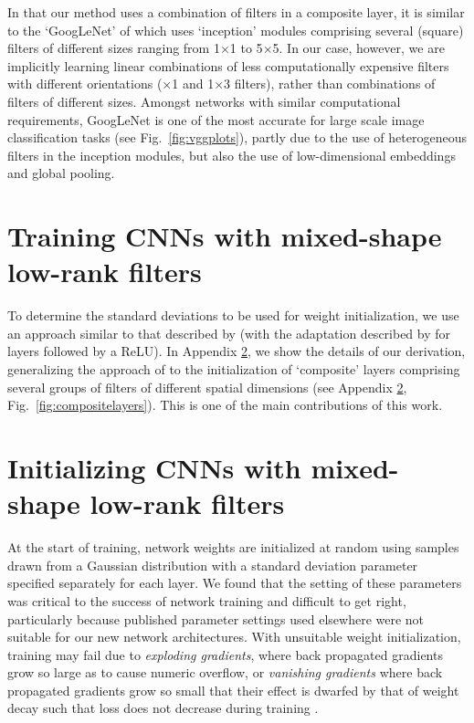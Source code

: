 \documentclass[thesis]{subfiles}
\begin{document}
    In that our method uses a combination of filters in a composite layer, it is similar to the `GoogLeNet' of \citet{journals/corr/SzegedyLJSRAEVR14} which uses `inception' modules comprising several (square) filters of different sizes ranging from 1$\times$1 to 5$\times$5. In our case, however, we are implicitly learning linear combinations of less computationally expensive filters with different orientations ($\times$1 and 1$\times$3 filters), rather than combinations of filters of different sizes. Amongst networks with similar computational requirements, GoogLeNet is one of the most accurate for large scale image classification tasks (see Fig.~\ref{fig:vggplots}), partly due to the use of heterogeneous filters in the inception modules, but also the use of low-dimensional embeddings and global pooling.

    \section{Training CNNs with mixed-shape low-rank filters}
    \label{initialization}
    To determine the standard deviations to be used for weight initialization, we use an approach similar to that described by \citet{glorot2010understanding} (with the adaptation described by \citet{journals/corr/HeZR015} for layers followed by a ReLU). In Appendix \ref{initializationderivation}, we show the details of our derivation, generalizing the approach of \citet{journals/corr/HeZR015} to the initialization of `composite' layers comprising several groups of filters of different spatial dimensions (see Appendix \ref{initializationderivation}, Fig.~\ref{fig:compositelayers}). This is one of the main contributions of this work.
    \section{Initializing CNNs with mixed-shape low-rank filters}
    \label{initializationderivation}
    At the start of training, network weights are initialized at random using samples drawn from a Gaussian distribution with a standard deviation parameter specified separately for each layer. We found that the setting of these parameters was critical to the success of network training and difficult to get right, particularly because published parameter settings used elsewhere were not suitable for our new network architectures. With unsuitable weight initialization, training may fail due to {\em exploding gradients}, where  back propagated gradients grow so large as to cause numeric overflow, or {\em vanishing gradients} where back propagated gradients grow so small that their effect is dwarfed by that of weight decay such that loss does not decrease during training \citep{Hochreiter01gradientflow}.
    
\end{document}
